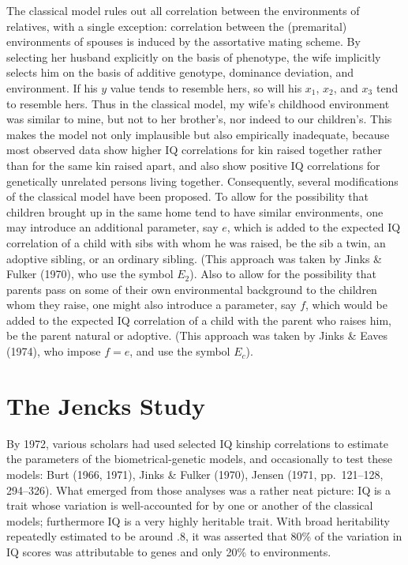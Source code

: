 ﻿\documentclass[12pt]{article}
\begin{document}
The classical model rules out all correlation between the environments of relatives, with a single exception: correlation between the (premarital) environments of spouses is induced by the assortative mating scheme. By selecting her husband explicitly on the basis of phenotype, the wife implicitly selects him on the basis of additive genotype, dominance deviation, and environment. If his $y$ value tends to resemble hers, so will his $x_1$, $x_2$, and $x_3$ tend to resemble hers. Thus in the classical model, my wife's childhood environment was similar to mine, but not to her brother's, nor indeed to our children's. This makes the model not only implausible but also empirically inadequate, because most observed data show higher IQ correlations for kin raised together rather than for the same kin raised apart, and also show positive IQ correlations for genetically unrelated persons living together. Consequently, several modifications of the classical model have been proposed. To allow for the possibility that children brought up in the same home tend to have similar environments, one may introduce an additional parameter, say $e$, which is added to the expected IQ correlation of a child with sibs with whom he was raised, be the sib a twin, an adoptive sibling, or an ordinary sibling. (This approach was taken by Jinks \& Fulker (1970), who use the symbol $E_2$). Also to allow for the possibility that parents pass on some of their own environmental background to the children whom they raise, one might also introduce a parameter, say $f$, which would be added to the expected IQ correlation of a child with the parent who raises him, be the parent natural or adoptive. (This approach was taken by Jinks \& Eaves (1974), who impose $f = e$, and use the symbol $E_c$).

\section{The Jencks Study}

By 1972, various scholars had used selected IQ kinship correlations to estimate the parameters of the biometrical-genetic models, and occasionally to test these models: Burt (1966, 1971), Jinks \& Fulker (1970), Jensen (1971, pp.\ 121--128, 294--326). What emerged from those analyses was a rather neat picture: IQ is a trait whose variation is well-accounted for by one or another of the classical models; furthermore IQ is a very highly heritable trait. With broad heritability repeatedly estimated to be around .8, it was asserted that 80\% of the variation in IQ scores was attributable to genes and only 20\% to environments.
\end{document}
